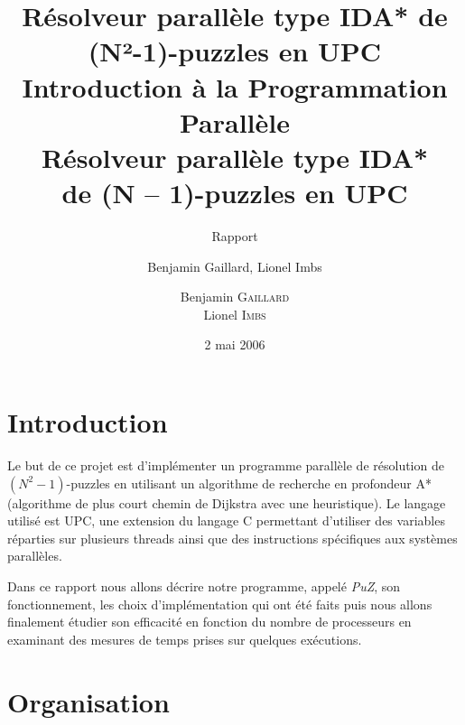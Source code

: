 \documentclass[a4paper,11pt]{report}
\title{Résolveur parallèle type IDA* de (N²-1)-puzzles en UPC}
\author{Benjamin Gaillard, Lionel Imbs}
\date{2 mai 2006}
\title{%
{\large Introduction à la Programmation Parallèle}\\
  Résolveur parallèle type IDA*\\de (N\up{2} -- 1)-puzzles en UPC%
}
\subtitle{Rapport}
\author{Benjamin \textsc{Gaillard}\\Lionel \textsc{Imbs}}
\newcommand{\puz}{\emph{PuZ}}
\begin{document}

\maketitle
\tableofcontents

\chapter*{Introduction}

Le but de ce projet est d'implémenter un programme parallèle de résolution de
$(N^2 - 1)$-puzzles en utilisant un algorithme de recherche en profondeur A*
(algorithme de plus court chemin de Dijkstra avec une heuristique). Le langage
utilisé est UPC, une extension du langage C permettant d'utiliser des
variables réparties sur plusieurs threads ainsi que des instructions
spécifiques aux systèmes parallèles.

Dans ce rapport nous allons décrire notre programme, appelé \puz, son
fonctionnement, les choix d'implémentation qui ont été faits puis nous allons
finalement étudier son efficacité en fonction du nombre de processeurs en
examinant des mesures de temps prises sur quelques exécutions.


\chapter{Organisation}
\end{document}

